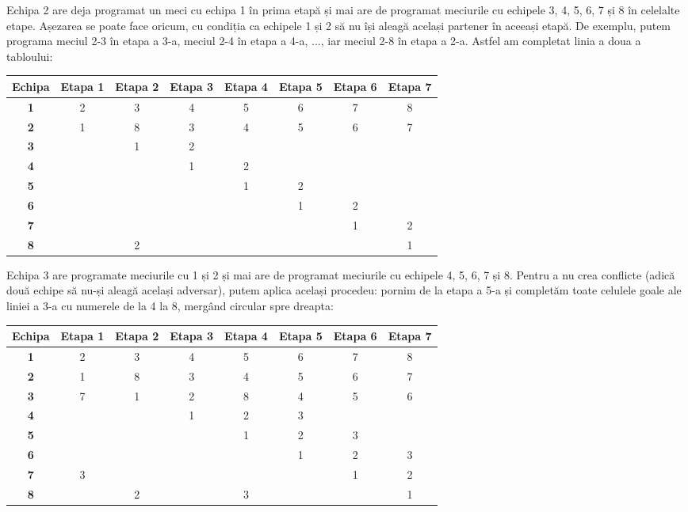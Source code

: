 Echipa 2 are deja programat un meci cu echipa 1 în prima etapă și mai are de
programat meciurile cu echipele 3, 4, 5, 6, 7 și 8 în celelalte
etape. Așezarea se poate face oricum, cu condiția ca echipele 1 și 2 să nu își
aleagă același partener în aceeași etapă. De exemplu, putem programa meciul
2-3 în etapa a 3-a, meciul 2-4 în etapa a 4-a, ..., iar meciul 2-8 în etapa a
2-a. Astfel am completat linia a doua a tabloului:

\begin{table}[H]
  \setlength{\tabcolsep}{5pt}
  \centering
  \begin{tabular}{c|ccccccc}
    \hline
        {\bf Echipa} & {\bf Etapa 1} & {\bf Etapa 2} & {\bf Etapa 3} &
        {\bf Etapa 4} & {\bf Etapa 5} & {\bf Etapa 6} & {\bf Etapa 7} \\ \hline
        {\bf 1} & 2 & 3 & 4 & 5 & 6 & 7 & 8 \\
        {\bf 2} & 1 & 8 & 3 & 4 & 5 & 6 & 7 \\
        {\bf 3} &   & 1 & 2 &   &   &   &   \\
        {\bf 4} &   &   & 1 & 2 &   &   &   \\
        {\bf 5} &   &   &   & 1 & 2 &   &   \\
        {\bf 6} &   &   &   &   & 1 & 2 &   \\
        {\bf 7} &   &   &   &   &   & 1 & 2 \\
        {\bf 8} &   & 2 &   &   &   &   & 1 \\
        \hline
  \end{tabular}
\end{table}

Echipa 3 are programate meciurile cu 1 și 2 și mai are de programat meciurile
cu echipele 4, 5, 6, 7 și 8. Pentru a nu crea conflicte (adică două echipe să
nu-și aleagă același adversar), putem aplica același procedeu: pornim de la
etapa a 5-a și completăm toate celulele goale ale liniei a 3-a cu numerele de
la 4 la 8, mergând circular spre dreapta:

\begin{table}[H]
  \setlength{\tabcolsep}{5pt}
  \centering
  \begin{tabular}{c|ccccccc}
    \hline
        {\bf Echipa} & {\bf Etapa 1} & {\bf Etapa 2} & {\bf Etapa 3} &
        {\bf Etapa 4} & {\bf Etapa 5} & {\bf Etapa 6} & {\bf Etapa 7} \\ \hline
        {\bf 1} & 2 & 3 & 4 & 5 & 6 & 7 & 8 \\
        {\bf 2} & 1 & 8 & 3 & 4 & 5 & 6 & 7 \\
        {\bf 3} & 7 & 1 & 2 & 8 & 4 & 5 & 6 \\
        {\bf 4} &   &   & 1 & 2 & 3 &   &   \\
        {\bf 5} &   &   &   & 1 & 2 & 3 &   \\
        {\bf 6} &   &   &   &   & 1 & 2 & 3 \\
        {\bf 7} & 3 &   &   &   &   & 1 & 2 \\
        {\bf 8} &   & 2 &   & 3 &   &   & 1 \\
        \hline
  \end{tabular}
\end{table}

